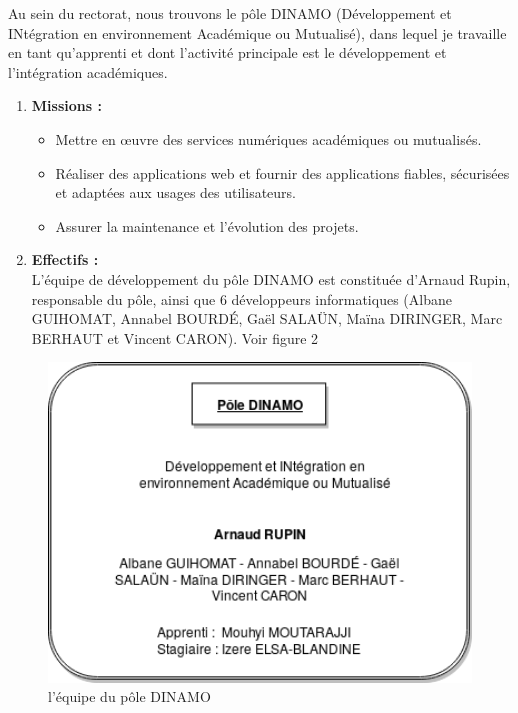 \documentclass[12pt]{article}
\begin{document}
Au sein du rectorat, nous trouvons le pôle DINAMO (Développement et INtégration en environnement Académique ou Mutualisé), dans lequel je travaille en tant qu'apprenti et dont l'activité principale est le développement et l'intégration académiques. 


\begin{enumerate}
\item \textbf{Missions :}\\

\begin{itemize}
\item  Mettre en œuvre des services numériques académiques ou mutualisés.
\item  Réaliser des applications web et fournir des applications fiables, sécurisées et adaptées aux usages des utilisateurs. 
\item  Assurer la maintenance et l'évolution des projets.\\
\end{itemize}

\item \textbf{Effectifs :}\\
L’équipe de développement du pôle DINAMO est constituée d’Arnaud Rupin, responsable du pôle, ainsi que 6 développeurs informatiques (Albane GUIHOMAT, Annabel BOURDÉ, Gaël SALAÜN, Maïna DIRINGER, Marc BERHAUT et Vincent CARON). Voir figure 2\\

\end{enumerate}

\begin{figure}[H]
	\centering
 		\includegraphics[width=1\textwidth]{diagrammes/PoleDinamo.png}
  		\caption{l'équipe du pôle DINAMO}
	\end{figure}
\end{document}
